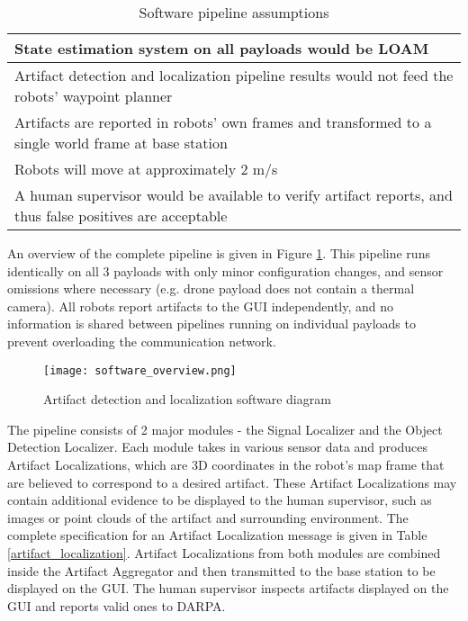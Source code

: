 \begin{table}
	\centering
	\begin{adjustbox}{max width=.95\textwidth}
		\begin{tabular}{ |l| } 
			\hline
State estimation system on all payloads would be LOAM \cite{zhang2014loam} \\ \hline
Artifact detection and localization pipeline results would not feed the robots' waypoint planner \\ \hline 
Artifacts are reported in robots' own frames and transformed to a single world frame at base station \\ \hline
Robots will move at approximately 2 m/s \\ \hline
A human supervisor would be available to verify artifact reports, and thus false positives are acceptable \\ \hline
		\end{tabular}
	\end{adjustbox}
	\caption{Software pipeline assumptions}
	\label{software_assumptions}
\end{table}

An overview of the complete pipeline is given in Figure \ref{software_overview}. This pipeline runs identically on all 3 payloads with only minor configuration changes, and sensor omissions where necessary (e.g. drone payload does not contain a thermal camera). All robots report artifacts to the GUI independently, and no information is shared between pipelines running on individual payloads to prevent overloading the communication network.

\begin{figure}	
	\centering
	\texttt{[image: software\_overview.png]}
	\caption{Artifact detection and localization software diagram}
	\label{software_overview}
\end{figure}

The pipeline consists of 2 major modules - the Signal Localizer and the Object Detection Localizer. Each module takes in various sensor data and produces Artifact Localizations, which are 3D coordinates in the robot's map frame that are believed to correspond to a desired artifact. These Artifact Localizations may contain additional evidence to be displayed to the human supervisor, such as images or point clouds of the artifact and surrounding environment. The complete specification for an Artifact Localization message is given in Table \ref{artifact_localization}. Artifact Localizations from both modules are combined inside the Artifact Aggregator and then transmitted to the base station to be displayed on the GUI. The human supervisor inspects artifacts displayed on the GUI and reports valid ones to DARPA.

